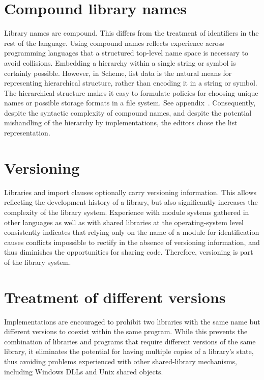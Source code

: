 \documentclass[twoside,twocolumn]{algol60}
\begin{document}
\section{Compound library names}

Library names are compound.  This differs from the treatment of
identifiers in the rest of the language.  Using compound names
reflects experience across programming languages that a structured
top-level name space is necessary to avoid collisions.  Embedding a
hierarchy within a single string or symbol is certainly possible.
However, in Scheme, list data is the natural means for representing
hierarchical structure, rather than encoding it in a string or symbol.
The hierarchical structure makes it easy to formulate policies for
choosing unique names or possible storage formats in a file system.
See appendix~.
Consequently, despite the syntactic complexity of compound
names, and despite the potential mishandling of the hierarchy by
implementations, the editors chose the list representation.

\section{Versioning}

Libraries and {\cf import} clauses optionally carry versioning
information.  This allows reflecting the development history of a
library, but also significantly increases the complexity of the
library system.  Experience with module systems gathered in other
languages as well as with shared libraries at the operating-system
level consistently indicates that relying only on the name of a module
for identification causes conflicts impossible to rectify in the
absence of versioning information, and thus diminishes the
opportunities for sharing code.  Therefore, versioning is part of the
library system.

\section{Treatment of different versions}

Implementations are encouraged to prohibit two
libraries with the same name but different versions to coexist
within the same program.
While this prevents the combination of libraries and
programs that require different versions of the same library,
it eliminates the potential for having multiple copies of a
library's state, thus avoiding problems experienced with
other shared-library mechanisms,
including Windows DLLs and Unix shared objects.
\end{document}
